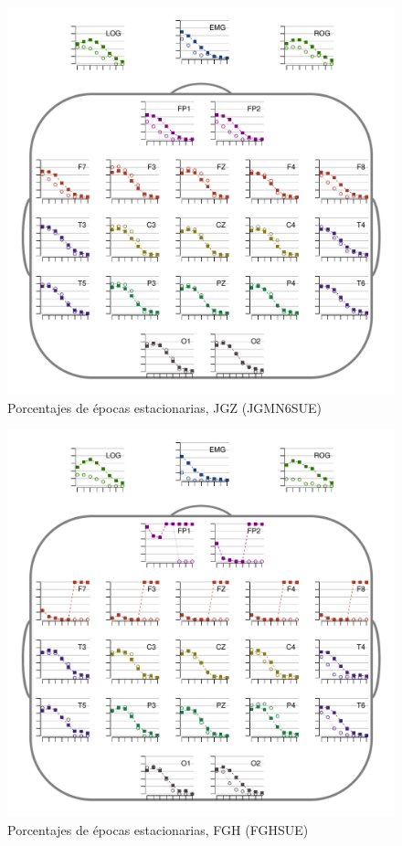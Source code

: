 \begin{figure}
\centering
\includegraphics[width=.9\linewidth]{./img_resultados/JGMN6SUE_cabeza_epocas_.pdf}
\caption{Porcentajes de épocas estacionarias, JGZ (JGMN6SUE)}
\end{figure}


\begin{figure}
\centering
\includegraphics[width=.9\linewidth]{./img_resultados/FGHSUE_cabeza_epocas_.pdf}
\caption{Porcentajes de épocas estacionarias, FGH (FGHSUE)}
\end{figure}

